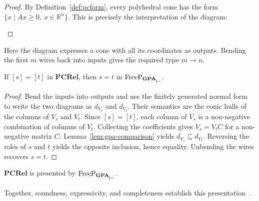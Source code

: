 \begin{proof}
    By Definition~\ref{def:pcform}, every polyhedral cone has the form
    $\{x \mid Ax \ge 0,\ x \in \mathbb{R}^n\}$. This is precisely the
    interpretation of the diagram:
    \begin{figure}[H]
        \centering
    \end{figure}
\end{proof}

Here the diagram expresses a cone with all its coordinates as outputs.
Bending the first $m$ wires back into inputs gives the required type $m\to n$.

\begin{lemma}[Completeness]
    If $[s]=[t]$ in $\mathbf{PCRel}$, then
    $s=t$ in $\mathrm{FreeP}_{\mathbf{GPA}_{\rtop}}$.
\end{lemma}

\begin{proof}
    Bend the inputs into outputs and use the finitely generated normal
    form to write the two diagrams as $d_{V_s}$ and $d_{V_t}$.
    Their semantics are the conic hulls of the columns of $V_s$ and $V_t$.
    Since $[s]=[t]$, each column of $V_s$ is a non-negative combination
    of columns of $V_t$. Collecting the coefficients gives
    $V_s=V_tC$ for a non-negative matrix $C$.
    Lemma~\ref{lem:gpa-comparison} yields $d_{V_s}\subseteq d_{V_t}$.
    Reversing the roles of $s$ and $t$ yields the opposite inclusion,
    hence equality. Unbending the wires recovers $s=t$.
\end{proof}

\begin{theorem}
    $\mathbf{PCRel}$ is presented by
    $\mathrm{FreeP}_{\mathbf{GPA}_{\rtop}}$.
\end{theorem}

Together, soundness, expressivity, and completeness establish this
presentation~\cite[Corollary~21]{bonchi2021polyhedral}.


